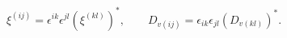 \begin{equation}
\xi^{(ij)}=\epsilon^{ik}\epsilon^{jl}\left(\xi^{(kl)}\right)^* 
, 
\qquad
D_{v(ij)}=\epsilon_{ik}\epsilon_{jl}\left(D_{v(kl)}\right)^* 
. 
\end{equation} 
